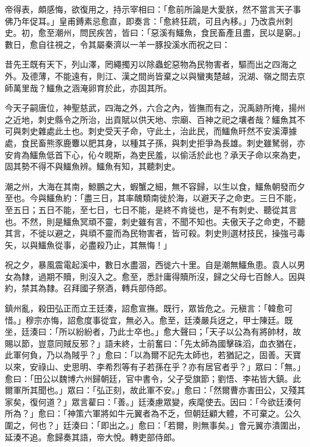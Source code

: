 \begin{pinyinscope}
 帝得表，頗感悔，欲復用之，持示宰相曰：「愈前所論是大愛朕，然不當言天子事佛乃年促耳。」皇甫鎛素忌愈直，即奏言：「愈終狂疏，可且內移。」乃改袁州刺史。初，愈至潮州，問民疾苦，皆曰：「惡溪有鱷魚，食民畜產且盡，民以是窮。」數日，愈自往視之，令其屬秦濟以一羊一豚投溪水而祝之曰：



 昔先王既有天下，列山澤，罔繩擉刃以除蟲蛇惡物為民物害者，驅而出之四海之外。及德薄，不能遠有，則江、漢之間尚皆棄之以與蠻夷楚越，況湖、嶺之間去京師萬里哉？鱷魚之涵淹卵育於此，亦固其所。



 今天子嗣唐位，神聖慈武，四海之外，六合之內，皆撫而有之，況禹跡所掩，揚州之近地，刺史縣令之所治，出貢賦以供天地、宗廟、百神之祀之壤者哉？鱷魚其不可與刺史雜處此土也。刺史受天子命，守此土，治此民，而鱷魚旰然不安溪潭據處，食民畜熊豕鹿麞以肥其身，以種其子孫，與刺史拒爭為長雄。刺史雖駑弱，亦安肯為鱷魚低首下心，伈々睍斯，為吏民羞，以偷活於此也？承天子命以來為吏，固其勢不得不與鱷魚辨。鱷魚有知，其聽刺史。



 潮之州，大海在其南，鯨鵬之大，蝦蟹之細，無不容歸，以生以食，鱷魚朝發而夕至也。今與鱷魚約：「盡三日，其率醜類南徙於海，以避天子之命吏。三日不能，至五日；五日不能，至七日，七日不能，是終不肯徙也，是不有刺史、聽從其言也。不然，則是鱷魚冥頑不靈，刺史雖有言，不聞不知也。夫傲天子之命吏，不聽其言，不徙以避之，與頑不靈而為民物害者，皆可殺。刺史則選材技民，操強弓毒矢，以與鱷魚從事，必盡殺乃止，其無悔！」



 祝之夕，暴風震電起溪中，數日水盡涸，西徙六十里。自是潮無鱷魚患。袁人以男女為隸，過期不贖，則沒入之。愈至，悉計庸得贖所沒，歸之父母七百餘人。因與約，禁其為隸。召拜國子祭酒，轉兵部侍郎。



 鎮州亂，殺田弘正而立王廷湊，詔愈宣撫。既行，眾皆危之。元稹言：「韓愈可惜。」穆宗亦悔，詔愈度事從宜，無必入。愈至，廷湊嚴兵迓之，甲士陳廷。既坐，廷湊曰：「所以紛紛者，乃此士卒也。」愈大聲曰；「天子以公為有將帥材，故賜以節，豈意同賊反邪？」語未終，士前奮曰：「先太師為國擊硃滔，血衣猶在，此軍何負，乃以為賊乎？」愈曰：「以為爾不記先太師也，若猶記之，固善。天寶以來，安祿山、史思明、李希烈等有子若孫在乎？亦有居官者乎？」眾曰：「無。」愈曰：「田公以魏博六州歸朝廷，官中書令，父子受旗節；劉悟、李祐皆大鎮。此爾軍所其聞也。」眾曰：「弘正刻，故此軍不安。」愈曰：「然爾曹亦害田公，又殘其家矣，復何道？」眾言雚曰：「善。」廷湊慮眾變，疾麾使去。因曰：「今欲廷湊何所為？」愈曰：「神策六軍將如牛元翼者為不乏，但朝廷顧大體，不可棄之。公久圍之，何也？」廷湊曰：「即出之。」愈曰：「若爾，則無事矣。」會元翼亦潰圍出，延湊不追。愈歸奏其語，帝大悅。轉吏部侍郎。




\end{pinyinscope}

